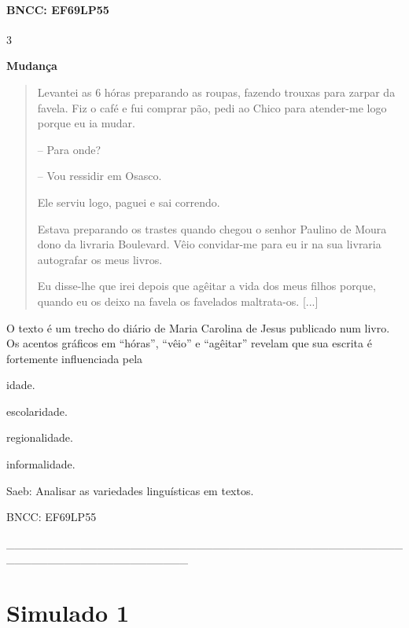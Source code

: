 \paragraph{BNCC: EF69LP55}

\num{3}

\textbf{Mudança}

\begin{quote}
Levantei as 6 hóras preparando as roupas, fazendo trouxas para zarpar da
favela. Fiz o café e fui comprar pão, pedi ao Chico para atender-me logo
porque eu ia mudar.

-- Para onde?

-- Vou ressidir em Osasco.

Ele serviu logo, paguei e sai correndo.

Estava preparando os trastes quando chegou o senhor Paulino de Moura
dono da livraria Boulevard. Vêio convidar-me para eu ir na sua livraria
autografar os meus livros.

Eu disse-lhe que irei depois que agêitar a vida dos meus filhos porque,
quando eu os deixo na favela os favelados maltrata-os. {[}...{]}
\end{quote}

O texto é um trecho do diário de Maria Carolina de Jesus publicado num
livro. Os acentos gráficos em ``hóras'', ``vêio'' e ``agêitar'' revelam
que sua escrita é fortemente influenciada pela

\begin{escolha}
\item idade.

\item escolaridade.

\item regionalidade.

\item informalidade.
\end{escolha}

Saeb: Analisar as variedades linguísticas em textos.

BNCC: EF69LP55

{\_\_\_\_\_\_\_\_\_\_\_\_\_\_\_\_\_\_\_\_\_\_\_\_\_\_\_\_\_\_\_\_\_\_\_\_\_\_\_\_\_\_\_\_\_\_\_\_\_\_\_\_\_\_\_\_\_\_\_\_\_\_\_\_\_\_\_\_\_\_}

\section{Simulado 1}

